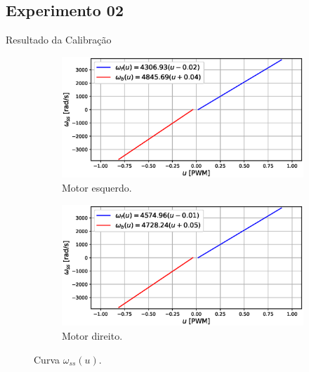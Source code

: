 \subsection{Experimento 02}
\begin{frame}{Resultado da Calibração}

\begin{figure}
    \begin{subfigure}{.45\textwidth}
    \centering
        \includegraphics[width=\textwidth]{figuras/resultados/exp02/curva_feedforward_esquerdo100.eps}
        \caption{Motor esquerdo.}
    \end{subfigure}
    \begin{subfigure}{.45\textwidth}
        \centering
        \includegraphics[width=\textwidth]{figuras/resultados/exp02/curva_feedforward_direito100.eps}
        \caption{Motor direito.}
    \end{subfigure}
    \caption{Curva $\omega_{ss}(u)$.}
\end{figure}

\end{frame}

